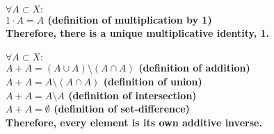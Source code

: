 \documentclass{article}
\begin{document}
\paragraph{\large
\(\forall A \subset X:\)
\\\indent \(1 \cdot A = A\) (definition of multiplication by 1)
\\Therefore, there is a unique multiplicative identity, 1.}

\paragraph{\large
\(\forall A \subset X:\)
\\\indent \(A + A = (A \cup A) \setminus (A \cap A)\) (definition of addition)
\\\indent \(A + A = A \setminus (A \cap A)\) (definition of union)
\\\indent \(A + A = A \setminus A\) (definition of intersection)
\\\indent \(A + A = \emptyset\) (definition of set-difference)
\\Therefore, every element is its own additive inverse.}
\end{document}
